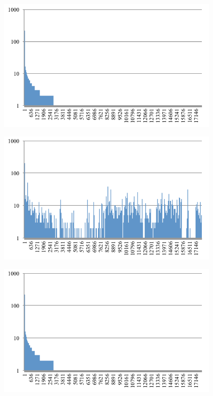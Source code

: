\documentclass[conference]{IEEEtran}
\newlength{\graphwidth}
\begin{document}
\begin{figure}[bt]
  \centering
  \setlength{\graphwidth}{0.32\textwidth}
  \begin{minipage}[b]{\graphwidth}
    \includegraphics[clip,width=1.0\columnwidth]{images/ORI_ASM}%
    \label{fig:asm-5gram-original-histogram}%
  \end{minipage}
  \hfill
  \begin{minipage}[b]{\graphwidth}
    \includegraphics[clip,width=1.0\columnwidth]{images/ALL_ASM}%
    \label{fig:asm-5gram-ALL-histogram}%
  \end{minipage}
  \hfill
  \begin{minipage}[b]{\graphwidth}
    \includegraphics[clip,width=1.0\columnwidth]{images/PG_ASM}%

\end{minipage}
\end{figure}
\end{document}
